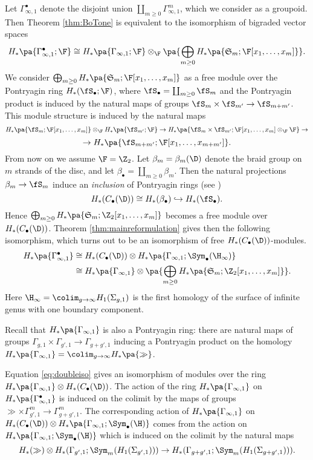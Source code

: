 Let $\Gamma_{\infty,1}^{\bullet}$ denote the disjoint union $\coprod_{m\geq 0}\Gamma_{\infty,1}^m$, which we
consider as a groupoid. Then Theorem \ref{thm:BoTone} is equivalent to the isomorphism of bigraded vector spaces
\[
  H_*\pa{\Gamma_{\infty,1}^{\bullet};\F}\cong H_*\pa{\Gamma_{\infty,1};\F}\otimes_{\F} \pa{\bigoplus_{m\geq 0} H_*\pa{\mathfrak{S}_m;\F[x_1,\dots,x_m]}}.
\]
We consider $\bigoplus_{m\geq 0} H_*\pa{\mathfrak{S}_m;\F[x_1,\dots,x_m]}$ as a free module over the Pontryagin ring
$H_*(\fS_{\bullet};\F)$, where $\fS_{\bullet}=\coprod_{m\geq 0}\fS_m$ and the Pontryagin product is induced by
the natural maps of groups $\fS_m\times\fS_{m'}\to\fS_{m+m'}$. This module structure is induced by the natural maps
\[
H_*\pa{\fS_m;\F[x_1,\dots,x_m]}\otimes_{\F} H_*\pa{\fS_{m'};\F}\to  H_*\pa{\fS_m\times\fS_{m'};\F[x_1,\dots,x_m]\otimes_{\F}\F} \to
\]
\[
\to H_*\pa{\fS_{m+m'};\F[x_1,\dots,x_{m+m'}]}. 
\]
From now on we assume $\F=\Z_2$.
Let $\beta_m=\beta_m(\D)$ denote the braid group on $m$ strands of the disc, and let $\beta_{\bullet}=\coprod_{m\geq 0}\beta_m$.
Then the natural projections $\beta_m\to\fS_m$ induce an \emph{inclusion} of Pontryagin rings (see \cite{CLM})
\[
 H_*(C_{\bullet}(\D))\cong H_*(\beta_{\bullet})\hookrightarrow H_*(\fS_{\bullet}).
\]
Hence $\bigoplus_{m\geq 0} H_*\pa{\mathfrak{S}_m;\Z_2[x_1,\dots,x_m]}$ becomes a free module over $H_*(C_{\bullet}(\D))$.
Theorem \ref{thm:mainreformulation} gives then the following isomorphism, which turns out to be an isomorphism of free
$H_*(C_{\bullet}(\D))$-modules.
\begin{equation}
 \label{eq:doubleiso}
\begin{split}
  H_*\pa{\Gamma_{\infty,1}^{\bullet}} & \cong H_*(C_{\bullet}(\D))\otimes H_*\pa{\Gamma_{\infty,1};\Sym_{\bullet}(\H_{\infty})}\\
  & \cong H_*\pa{\Gamma_{\infty,1}}\otimes \pa{\bigoplus_{m\geq 0} H_*\pa{\mathfrak{S}_m;\Z_2[x_1,\dots,x_m]}}.
  \end{split}
\end{equation}
Here $\H_{\infty}=\colim_{g\to\infty} H_1(\Sigma_{g,1})$ is the first homology of the surface of infinite genus with one
boundary component.

Recall that $H_*\pa{\Gamma_{\infty,1}}$ is also a Pontryagin ring: there are natural maps of groups
$\Gamma_{g,1}\times\Gamma_{g',1}\to\Gamma_{g+g',1}$ inducing a Pontryagin product on the homology 
$H_*\pa{\Gamma_{\infty,1}}=\colim_{g\to\infty} H_*\pa{\gg}$.

Equation \ref{eq:doubleiso} gives
an isomorphism of modules over the ring
$H_*\pa{\Gamma_{\infty,1}}\otimes H_*(C_{\bullet}(\D))$. The action of the ring $H_*\pa{\Gamma_{\infty,1}}$
on $H_*\pa{\Gamma_{\infty,1}^{\bullet}}$ is induced on the colimit by 
the maps of groups $\gg\times\Gamma_{g',1}^m\to\Gamma_{g+g',1}^m$.
The corresponding action of $H_*\pa{\Gamma_{\infty,1}}$ on $H_*(C_{\bullet}(\D))\otimes H_*\pa{\Gamma_{\infty,1};\Sym_{\bullet}(\H)}$
comes from the action on $ H_*\pa{\Gamma_{\infty,1};\Sym_{\bullet}(\H)}$ which is induced on the colimit by the natural maps
\[
 H_*(\gg)\otimes H_*(\Gamma_{g',1};\Sym_m(H_1(\Sigma_{g',1})))\to H_*(\Gamma_{g+g',1};\Sym_m(H_1(\Sigma_{g+g',1}))).
\]

